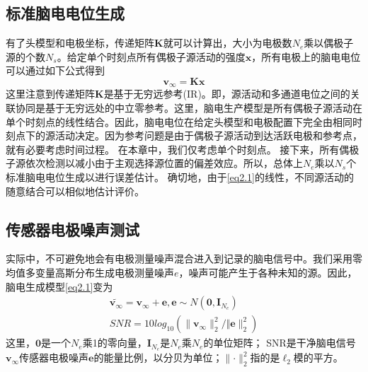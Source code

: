 \subsection{标准脑电电位生成}
有了头模型和电极坐标，传递矩阵$\mathbf{K}$就可以计算出，大小为电极数$N_e$乘以偶极子源的个数$N_s$。给定单个时刻点所有偶极子源活动的强度$\mathbf{x}$，所有电极上的脑电电位可以通过如下公式得到
\begin{equation}\label{eq2.1}
\mathbf{v}_{\infty}=\mathbf{Kx}
\end{equation}
这里注意到传递矩阵$\mathbf{K}$是基于无穷远参考(IR)。即，源活动和多通道电位之间的关联协同是基于无穷远处的中立零参考。这里，脑电生产模型是所有偶极子源活动在单个时刻点的线性结合。因此，脑电电位在给定头模型和电极配置下完全由相同时刻点下的源活动决定。因为参考问题是由于偶极子源活动到达活跃电极和参考点，就有必要考虑时间过程。 在本章中，我们仅考虑单个时刻点。 接下来，所有偶极子源依次检测以减小由于主观选择源位置的偏差效应。所以，总体上$N_e$乘以$N_s$个标准脑电电位生成以进行误差估计。 确切地，由于\eqref{eq2.1}的线性，不同源活动的随意结合可以相似地估计评价。
\subsection{传感器电极噪声测试}
实际中，不可避免地会有电极测量噪声混合进入到记录的脑电信号中。我们采用零均值多变量高斯分布生成电极测量噪声$e$，噪声可能产生于各种未知的源。因此，脑电生成模型\eqref{eq2.1}变为
\begin{equation}\label{eq2.2}
\begin{split}
\tilde{\mathbf{v}_{\infty}}=\mathbf{v}_{\infty}+\mathbf{e},\mathbf{e}\sim{N(\mathbf{0},\mathbf{I}_{N_e})}\\
SNR=10log_{10}(\lVert{\mathbf{v}_\infty}\rVert_2^2/\Vert{\mathbf{e}}\rVert_2^2)
\end{split}
\end{equation}
这里，$\mathbf{0}$是一个$N_e$乘1的零向量，$\mathbf{I}_{N_e}$是$N_e$乘$N_e$的单位矩阵； SNR是干净脑电信号$\mathbf{v}_{\infty}$传感器电极噪声$\mathbf{e}$的能量比例，以分贝为单位；$\lVert{\cdot}\rVert_2^2$指的是$\ell_2$模的平方。
